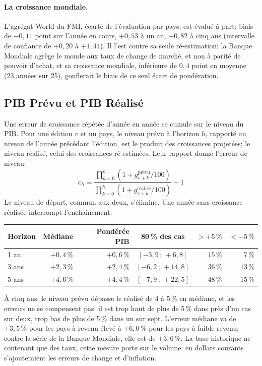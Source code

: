 \documentclass[11pt,a4paper]{article}
\begin{document}
\paragraph{La croissance mondiale.} L'agrégat \og World \fg{} du FMI, écarté de l'évaluation par pays, est évalué à part: biais de $-0{,}11$ point sur l'année en cours, $+0{,}53$ à un an, $+0{,}82$ à cinq ans (intervalle de confiance de $+0{,}20$ à $+1{,}44$). Il l'est contre sa seule ré-estimation: la Banque Mondiale agrège le monde aux taux de change de marché, et non à parité de pouvoir d'achat, et sa croissance mondiale, inférieure de $0{,}4$ point en moyenne (23 années sur 25), gonflerait le biais de ce seul écart de pondération.

\subsection{PIB Prévu et PIB Réalisé}
Une erreur de croissance répétée d'année en année se cumule sur le niveau du PIB. Pour une édition $v$ et un pays, le niveau prévu à l'horizon $h$, rapporté au niveau de l'année précédant l'édition, est le produit des croissances projetées; le niveau réalisé, celui des croissances ré-estimées. Leur rapport donne l'erreur de niveau:
\begin{equation}
e_h = \frac{\prod_{k=0}^{h}\left(1 + g^{\text{prévu}}_{v+k}/100\right)}{\prod_{k=0}^{h}\left(1 + g^{\text{réalisé}}_{v+k}/100\right)} - 1
\end{equation}
Le niveau de départ, commun aux deux, s'élimine. Une année sans croissance réalisée interrompt l'enchaînement.

\begin{center}\small
\begin{tabular}{lrrcrr}
\hline
\textbf{Horizon} & \textbf{Médiane} & \textbf{Pondérée PIB} & \textbf{80\,\% des cas} & \textbf{$>+5\,\%$} & \textbf{$<-5\,\%$} \\
\hline
1 an & $+0{,}4\,\%$ & $+0{,}6\,\%$ & $[-3{,}9\,;\,+6{,}8]$ & $15\,\%$ & $7\,\%$ \\
3 ans & $+2{,}3\,\%$ & $+2{,}4\,\%$ & $[-6{,}2\,;\,+14{,}8]$ & $36\,\%$ & $13\,\%$ \\
5 ans & $+4{,}6\,\%$ & $+4{,}4\,\%$ & $[-7{,}9\,;\,+22{,}5]$ & $48\,\%$ & $15\,\%$ \\
\hline
\end{tabular}
\end{center}

À cinq ans, le niveau prévu dépasse le réalisé de 4 à 5\,\% en médiane, et les erreurs ne se compensent pas: il est trop haut de plus de 5\,\% dans près d'un cas sur deux, trop bas de plus de 5\,\% dans un sur sept. L'erreur médiane va de $+3{,}5\,\%$ pour les pays à revenu élevé à $+6{,}0\,\%$ pour les pays à faible revenu; contre la série de la Banque Mondiale, elle est de $+3{,}6\,\%$. La base historique ne contenant que des taux, cette mesure porte sur le volume: en dollars courants s'ajouteraient les erreurs de change et d'inflation.
\end{document}
